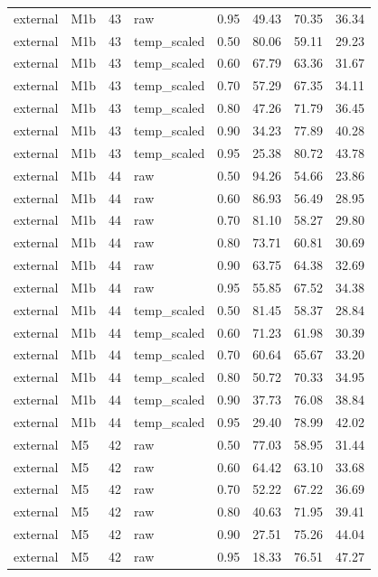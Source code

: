 \begin{tabular}{llrlrrrr}
external & M1b & 43 & raw & 0.95 & 49.43 & 70.35 & 36.34 \\
external & M1b & 43 & temp\_scaled & 0.50 & 80.06 & 59.11 & 29.23 \\
external & M1b & 43 & temp\_scaled & 0.60 & 67.79 & 63.36 & 31.67 \\
external & M1b & 43 & temp\_scaled & 0.70 & 57.29 & 67.35 & 34.11 \\
external & M1b & 43 & temp\_scaled & 0.80 & 47.26 & 71.79 & 36.45 \\
external & M1b & 43 & temp\_scaled & 0.90 & 34.23 & 77.89 & 40.28 \\
external & M1b & 43 & temp\_scaled & 0.95 & 25.38 & 80.72 & 43.78 \\
external & M1b & 44 & raw & 0.50 & 94.26 & 54.66 & 23.86 \\
external & M1b & 44 & raw & 0.60 & 86.93 & 56.49 & 28.95 \\
external & M1b & 44 & raw & 0.70 & 81.10 & 58.27 & 29.80 \\
external & M1b & 44 & raw & 0.80 & 73.71 & 60.81 & 30.69 \\
external & M1b & 44 & raw & 0.90 & 63.75 & 64.38 & 32.69 \\
external & M1b & 44 & raw & 0.95 & 55.85 & 67.52 & 34.38 \\
external & M1b & 44 & temp\_scaled & 0.50 & 81.45 & 58.37 & 28.84 \\
external & M1b & 44 & temp\_scaled & 0.60 & 71.23 & 61.98 & 30.39 \\
external & M1b & 44 & temp\_scaled & 0.70 & 60.64 & 65.67 & 33.20 \\
external & M1b & 44 & temp\_scaled & 0.80 & 50.72 & 70.33 & 34.95 \\
external & M1b & 44 & temp\_scaled & 0.90 & 37.73 & 76.08 & 38.84 \\
external & M1b & 44 & temp\_scaled & 0.95 & 29.40 & 78.99 & 42.02 \\
external & M5 & 42 & raw & 0.50 & 77.03 & 58.95 & 31.44 \\
external & M5 & 42 & raw & 0.60 & 64.42 & 63.10 & 33.68 \\
external & M5 & 42 & raw & 0.70 & 52.22 & 67.22 & 36.69 \\
external & M5 & 42 & raw & 0.80 & 40.63 & 71.95 & 39.41 \\
external & M5 & 42 & raw & 0.90 & 27.51 & 75.26 & 44.04 \\
external & M5 & 42 & raw & 0.95 & 18.33 & 76.51 & 47.27 \\

\end{tabular}
